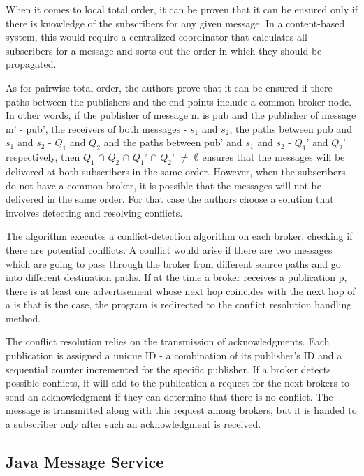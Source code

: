 \documentclass{sigplanconf}
\begin{document}
When it comes to local total order, it can be proven that it can be ensured only if there is knowledge of the subscribers for any given message. In a content-based system, this would require a centralized coordinator that calculates all subscribers for a message and sorts out the order in which they should be propagated.

As for pairwise total order, the authors prove that it can be ensured if there paths between the publishers and the end points include a common broker node. In other words, if the publisher of message m is pub and the publisher of message m' - pub', the receivers of both messages - $s_{1}$ and $s_{2}$, the paths between pub and $s_{1}$ and $s_{2}$ - $Q_{1}$ and $Q_{2}$ and the paths between pub' and $s_{1}$ and $s_{2}$ - $Q_{1}$' and $Q_{2}$' respectively, then $Q_{1}$ $\cap$ $Q_{2}$ $\cap$ $Q_{1}$' $\cap$ $Q_{2}$' $\neq$ $\emptyset$  ensures that the messages will be delivered at both subscribers in the same order. However, when the subscribers do not have a common broker, it is possible that the messages will not be delivered in the same order. For that case the authors choose a solution that involves detecting and resolving conflicts.

The algorithm executes a conflict-detection algorithm on each broker, checking if there are potential conflicts. A conflict would arise if there are two messages which are going to pass through the broker from different source paths and go into different destination paths. If at the time a broker receives a publication p, there is at least one advertisement whose next hop coincides with the next hop of a  is that is the case, the program is redirected to the conflict resolution handling method.

The conflict resolution relies on the transmission of acknowledgments. Each publication is assigned a unique ID - a combination of its publisher's ID and a sequential counter incremented for the specific publisher. If a broker detects possible conflicts, it will add to the publication a request for the next brokers to send an acknowledgment if they can determine that there is no conflict. The message is transmitted along with this request among brokers, but it is handed to a subscriber only after such an acknowledgment is received.

\subsection*{Java Message Service}
\end{document}
